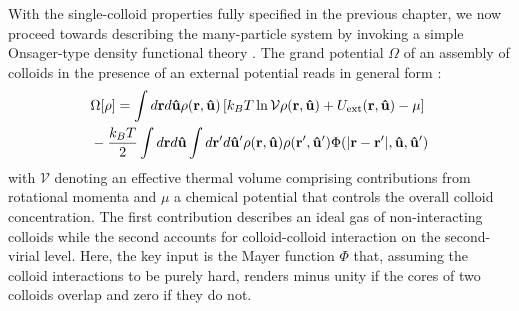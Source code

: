  With the single-colloid properties fully specified in the previous chapter, we now proceed towards describing the many-particle system by invoking a simple Onsager-type density functional theory \cite{Onsager}. The grand potential $\Omega$ of an assembly of colloids in the presence of an external  potential  reads in general form \cite{allenevans}:
 \begin{align}
 &  \Omega[\rho ]  = \int d {\bf r} d {\bf \hat{u}}  \rho({\bf r}, {\bf \hat{u}}) \left [k_{B}T \ln {\mathcal V}   \rho({\bf r}, {\bf \hat{u}})  +   U_{\rm ext}({\bf r}, {\bf \hat{u}}) - \mu  \right ] \nonumber \\
 & -\frac{k_{B}T}{2} \int d {\bf r} d {\bf \hat{u}} \int d {\bf r}^{\prime} d {\bf \hat{u}}^{\prime}  \rho({\bf r}, {\bf \hat{u}})  \rho({\bf r}^{\prime}, {\bf \hat{u}}^{\prime}) \Phi(|{\bf r} - {\bf r}^{\prime}|, {\bf \hat{u}}, {\bf \hat{u}}^{\prime} )
 \label{grandpot}
 \end{align}
 with ${\mathcal V}$ denoting an effective thermal volume comprising contributions from rotational momenta and $\mu$ a chemical potential that controls the overall colloid concentration.  The first contribution describes an ideal gas of  non-interacting colloids while the second accounts for colloid-colloid interaction on the second-virial level. Here, the key input is the Mayer function $\Phi$  that, assuming the colloid interactions to be purely hard, renders minus unity if the cores of two colloids overlap and zero if they do not.

